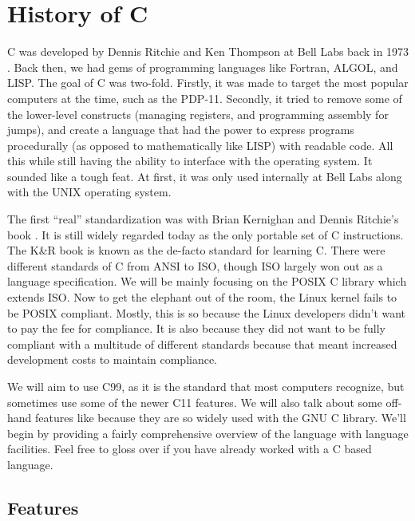 \section{History of C}

C was developed by Dennis Ritchie and Ken Thompson at Bell Labs back in 1973 \cite{Ritchie:1993:DCL:155360.155580}.
Back then, we had gems of programming languages like Fortran, ALGOL, and LISP.
The goal of C was two-fold.
Firstly, it was made to target the most popular computers at the time, such as the PDP-11.
Secondly, it tried to remove some of the lower-level constructs (managing registers, and programming assembly for jumps), and create a language that had the power to express programs procedurally (as opposed to mathematically like LISP) with readable code.
All this while still having the ability to interface with the operating system.
It sounded like a tough feat.
At first, it was only used internally at Bell Labs along with the UNIX operating system.

The first ``real'' standardization was with Brian Kernighan and Dennis Ritchie's book \cite{kernighan1988c}.
It is still widely regarded today as the only portable set of C instructions.
The K\&R book is known as the de-facto standard for learning C.
There were different standards of C from ANSI to ISO, though ISO largely won out as a language specification.
We will be mainly focusing on the POSIX C library which extends ISO.
Now to get the elephant out of the room, the Linux kernel fails to be POSIX compliant.
Mostly, this is so because the Linux developers didn't want to pay the fee for compliance.
It is also because they did not want to be fully compliant with a multitude of different standards because that meant increased development costs to maintain compliance.

We will aim to use C99, as it is the standard that most computers recognize, but sometimes use some of the newer C11 features.
We will also talk about some off-hand features like  because they are so widely used with the GNU C library.
We'll begin by providing a fairly comprehensive overview of the language with language facilities.
Feel free to gloss over if you have already worked with a C based language.

\subsection{Features}

